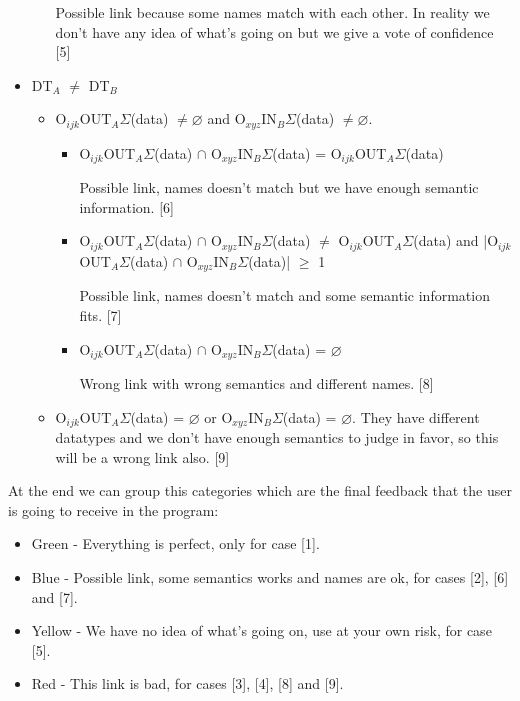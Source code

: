 \documentclass[a4paper,10pt]{article}
\begin{document}
\begin{itemize}
\begin{itemize}
      Possible link because some names match with each other. In reality we don't have any idea of what's going on but we give a vote of confidence [5]

    \end{itemize}


  \item DT$_{A}$ $\neq$ DT$_{B}$
    \begin{itemize}
    \item O$_{ijk}$OUT$_{A}\Sigma$(data) $\neq \varnothing$ and O$_{xyz}$IN$_{B}\Sigma$(data) $\neq \varnothing$.
      \begin{itemize}
      \item O$_{ijk}$OUT$_{A}\Sigma$(data) $\cap$ O$_{xyz}$IN$_{B}\Sigma$(data) = O$_{ijk}$OUT$_{A}\Sigma$(data)

	Possible link, names doesn't match but we have enough semantic information. [6]

      \item O$_{ijk}$OUT$_{A}\Sigma$(data) $\cap$ O$_{xyz}$IN$_{B}\Sigma$(data) $\neq$ O$_{ijk}$OUT$_{A}\Sigma$(data) and |O$_{ijk}$OUT$_{A}\Sigma$(data) $\cap$ O$_{xyz}$IN$_{B}\Sigma$(data)| $\geq$ 1 
      
	Possible link, names doesn't match and some semantic information fits.  [7]

      \item O$_{ijk}$OUT$_{A}\Sigma$(data) $\cap$ O$_{xyz}$IN$_{B}\Sigma$(data) = $\varnothing$

	Wrong link with wrong semantics and different names. [8]

      \end{itemize}

    \item O$_{ijk}$OUT$_{A}\Sigma$(data) = $\varnothing$ or O$_{xyz}$IN$_{B}\Sigma$(data) = $\varnothing$.
      They have different datatypes and we don't have enough semantics to judge in favor, so this will be a wrong link also. [9]

    \end{itemize}

  \end{itemize}

  At the end we can group this categories which are the final feedback that the user is going to receive in the program:
\begin{itemize}
  \item Green - Everything is perfect, only for case [1].
  \item Blue - Possible link, some semantics works and names are ok, for cases [2], [6] and [7].
  \item Yellow - We have no idea of what's going on, use at your own risk, for case [5].
  \item Red - This link is bad, for cases [3], [4], [8] and [9].
\end{itemize}
\end{document}
